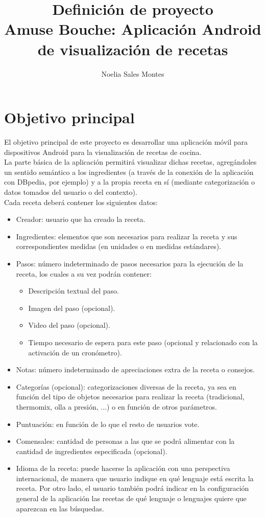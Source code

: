 \documentclass[a4paper,11pt]{article}
\title{Definición de proyecto\\Amuse Bouche: Aplicación Android de visualización de recetas}
\author{Noelia Sales Montes}
\date{\fecha}
\begin{document}
\maketitle

\vspace*{1cm}

\section{Objetivo principal}

El objetivo principal de este proyecto es desarrollar una aplicación móvil para dispositivos Android para la visualización de recetas de cocina.\\

La parte básica de la aplicación permitirá visualizar dichas recetas, agregándoles un sentido semántico a los ingredientes (a través de la conexión de la aplicación con DBpedia, por ejemplo) y a la propia receta en sí (mediante categorización o datos tomados del usuario o del contexto).\\

Cada receta deberá contener los siguientes datos:
\begin{itemize}
\item Creador: usuario que ha creado la receta.
\item Ingredientes: elementos que son necesarios para realizar la receta y sus correspondientes medidas (en unidades o en medidas estándares).
\item Pasos: número indeterminado de pasos necesarios para la ejecución de la receta, los cuales a su vez podrán contener:
\begin{itemize}
\item Descripción textual del paso.
\item Imagen del paso (opcional).
\item Video del paso (opcional).
\item Tiempo necesario de espera para este paso (opcional y relacionado con la activación de un cronómetro).
\end{itemize}
\item Notas: número indeterminado de apreciaciones extra de la receta o consejos.
\item Categorías (opcional): categorizaciones diversas de la receta, ya sea en función del tipo de objetos necesarios para realizar la receta (tradicional, thermomix, olla a presión, ...) o en función de otros parámetros.
\item Puntuación: en función de lo que el resto de usuarios vote.
\item Comensales: cantidad de personas a las que se podrá alimentar con la cantidad de ingredientes especificada (opcional).
\item Idioma de la receta: puede hacerse la aplicación con una perspectiva internacional, de manera que usuario indique en qué lenguaje está escrita la receta. Por otro lado, el usuario también podrá indicar en la configuración general de la aplicación las recetas de qué lenguaje o lenguajes quiere que aparezcan en las búsquedas.
\end{itemize}
\end{document}
